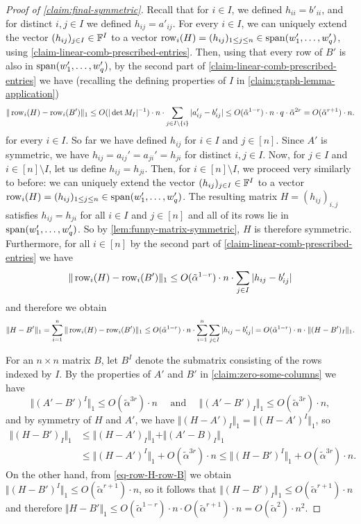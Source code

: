 \documentclass{daj}
\theoremstyle{plain}
\theoremstyle{plain}
\theoremstyle{plain}
\theoremstyle{plain}
\theoremstyle{definition}
\theoremstyle{plain}
\theoremstyle{plain}
\theoremstyle{definition}
\theoremstyle{definition}
\theoremstyle{plain}
\begin{document}
\begin{proof}
[Proof of \cref{claim:final-symmetric}]
Recall that for $i\in I$, we defined $h_{ii}=b'_{ii}$, and for distinct $i,j\in I$ we defined $h_{ij}=a'_{ij}$. For every $i\in I$, we can uniquely extend the vector $(h_{ij})_{j\in I}\in \mathbb{F}^I$ to a vector $\operatorname{row}_i(H)=(h_{ij})_{1\le j\le n}\in \operatorname{span}(w_1',\dots,w_q')$, using \cref{claim-linear-comb-prescribed-entries}. Then, using that every row of $B'$ is also in $\operatorname{span}(w_1',\dots,w_q')$, by the second part of \cref{claim-linear-comb-prescribed-entries} we have (recalling the defining properties of $I$ in \cref{claim:graph-lemma-application})
\begin{equation}
\Vert \operatorname{row}_i(H)-\operatorname{row}_i(B')\Vert_1 \leq  O(|\det M_I|^{-1})\cdot n\cdot \sum_{j\in I\setminus\lbrace i\rbrace}\vert a'_{ij}-b'_{ij}\vert\le O(\tilde{\alpha}^{1-r})\cdot n\cdot q\cdot \tilde\alpha^{2r}=O(\tilde\alpha^{r+1})\cdot n.\label{eq-row-H-row-B}
\end{equation}
for every $i\in I$. So far we have defined $h_{ij}$ for $i\in I$ and $j\in [n]$. Since $A'$ is symmetric, we have $h_{ij}=a_{ij}'=a_{ji}'=h_{ji}$ for distinct $i,j\in I$. Now, for $j\in I$ and $i\in [n]\setminus I$, let us define $h_{ij}=h_{ji}$. Then, for $i\in [n]\setminus I$, we proceed very similarly to before: we can uniquely extend the vector $(h_{ij})_{j\in I}\in \mathbb{F}^I$ to a vector $\operatorname{row}_i(H)=(h_{ij})_{1\le j\le n}\in \operatorname{span}(w_1',\dots,w_q')$. The resulting matrix $H=(h_{ij})_{i,j}$ satisfies $h_{ij}=h_{ji}$ for all $i\in I$ and $j\in [n]$ and all of its rows lie in $\operatorname{span}(w_1',\dots,w_q')$. So by \cref{lem:funny-matrix-symmetric}, $H$ is therefore symmetric. Furthermore, for all $i\in [n]$ by the second part of \cref{claim-linear-comb-prescribed-entries} we have
\[\Vert \operatorname{row}_i(H)-\operatorname{row}_i(B')\Vert_1\leq O(\tilde{\alpha}^{1-r})\cdot n\cdot \sum_{j\in I}\vert h_{ij}-b'_{ij}\vert\]
and therefore we obtain
\[\Vert H-B'\Vert_1=\sum_{i=1}^n \Vert \operatorname{row}_i(H)-\operatorname{row}_i(B')\Vert_1\leq O(\tilde{\alpha}^{1-r})\cdot n\cdot \sum_{i=1}^n\sum_{j\in I}\vert h_{ij}-b'_{ij}\vert=O(\tilde{\alpha}^{1-r})\cdot n\cdot \Vert (H-B')_I\Vert_1.\]

For an $n\times n$ matrix $B$, let $B^I$ denote the submatrix consisting of the rows indexed by $I$. By the properties of $A'$ and $B'$ in \cref{claim:zero-some-columns} we have
\[\Vert (A'-B')^I\Vert_1\le O(\tilde \alpha^{3r})\cdot n\quad\text{ and }\quad \Vert (A'-B')_I\Vert_1\le O(\tilde \alpha^{3r})\cdot n,\]
and by symmetry of $H$ and $A'$, we have $\Vert (H-A')_I\Vert_1=\Vert (H-A')^I\Vert_1$, so
\begin{align*}
\Vert (H-B')_I\Vert_1&\leq \Vert (H-A')_I\Vert_1+\Vert (A'-B)_I\Vert_1\\
&\le \Vert (H-A')^I\Vert_1+O(\tilde \alpha^{3r})\cdot n\le\Vert (H-B')^I\Vert_1+O(\tilde \alpha^{3r})\cdot n.
\end{align*}
On the other hand, from \cref{eq-row-H-row-B} we obtain $\Vert (H-B')^I\Vert_1\leq O(\tilde\alpha^{r+1})\cdot n$, so it follows that $\Vert (H-B')_I\Vert_1\leq O(\tilde\alpha^{r+1})\cdot n$ and therefore $\Vert H-B'\Vert_1\le O(\tilde\alpha^{1-r})\cdot n\cdot O(\tilde\alpha^{r+1})\cdot n=O(\tilde\alpha^2)\cdot n^2$.
\end{proof}
\end{document}
